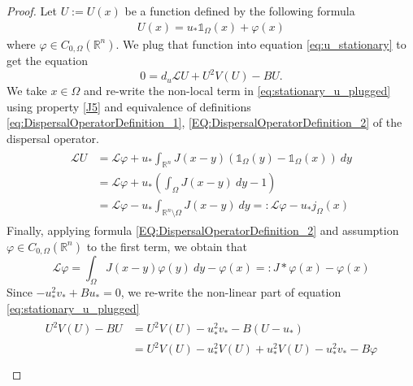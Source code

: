 \documentclass[12pt, a4paper]{article}
\theoremstyle{break}
\theoremstyle{break}
\theoremstyle{break}
\theoremstyle{break}
\theoremstyle{break}
\theoremstyle{break}
\theoremstyle{break}
\begin{document}
\begin{proof}
    Let $U:= U(x)$ be a function defined by the following formula
    \begin{align}
        \label{eq:stationary_u_definition}
        U(x) 
        = 
        u_* \mathds{1}_{\Omega}(x) + \varphi(x)
    \end{align}
    where $\varphi \in C_{0, \Omega}(\mathbb{R}^n)$. We plug that function into equation \eqref{eq:u_stationary} to get the equation
    \begin{equation}
        \label{eq:stationary_u_plugged}
        0 = d_u \mathcal{L} U + U^2 V(U) - B U.
    \end{equation}
    We take $x \in \Omega$ and re-write the non-local term in \eqref{eq:stationary_u_plugged} using property \ref{J5} and equivalence of definitions \eqref{eq:DispersalOperatorDefinition_1}, \eqref{EQ:DispersalOperatorDefinition_2} of the dispersal operator.
    \begin{align}
        \label{eq:non-local-part-u-reformulation}
        \begin{split}
        \mathcal{L}U 
        &=
            \mathcal{L}\varphi + u_*  \int_{\mathbb{R}^n} J(x-y)\left(\mathds{1}_{\Omega}(y) - \mathds{1}_{\Omega}(x)\right)\:dy  \\
            &= \mathcal{L}\varphi + u_* \left( \int_\Omega J(x-y)\:dy - 1 \right) \\
            &= \mathcal{L}\varphi - u_*  \int_{\mathbb{R}^n \setminus \Omega} J(x-y)\:dy =: \mathcal{L}\varphi - u_* j_\Omega(x)
        \end{split}
    \end{align}
    Finally, applying formula \eqref{EQ:DispersalOperatorDefinition_2} and assumption $\varphi \in C_{0, \Omega}(\mathbb{R}^n)$ to the first term, we obtain that
    \begin{equation}
        \label{eq:non-local-part-u-stationary-plugged}
        \mathcal{L}\varphi =  \int_{\Omega} J(x-y) \varphi(y)\:dy - \varphi(x) =: J *\varphi(x) - \varphi(x)
    \end{equation}
    Since $-u_*^2v_* + Bu_*=0$, we re-write the non-linear part of equation \eqref{eq:stationary_u_plugged}
    \begin{align}
        \label{eq:non-linear-part-u-stationary-plugged}
        \begin{split}
            U^2 V(U) - B U 
            &= U^2 V(U) - u_*^2 v_* - B (U - u_*) \\
            &= U^2 V(U) - u_*^2 V(U) + u_*^2 V(U) - u_*^2 v_* - B \varphi  \\

\end{split}
\end{align}
\end{proof}
\end{document}

